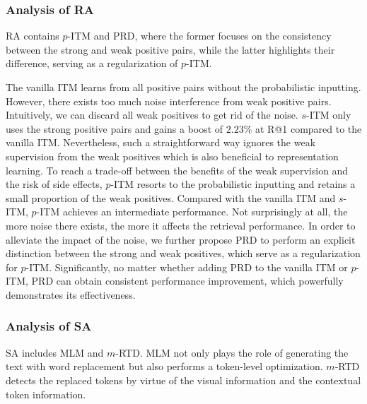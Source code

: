 \documentclass{article}
\begin{document}
\subsubsection{Analysis of RA}
RA contains $p$-ITM and PRD, where the former focuses on the consistency between the strong and weak positive pairs, while the latter highlights their difference, serving as a regularization of $p$-ITM. 

The vanilla ITM learns from all positive pairs without the probabilistic inputting.
However, there exists too much noise interference from weak positive pairs.
Intuitively, we can discard all weak positives to get rid of the noise. 
$s$-ITM only uses the strong positive pairs and gains a boost of $2.23$\% at R@1 compared to the vanilla ITM.
Nevertheless, such a straightforward way ignores the weak supervision from the weak positives which is also beneficial to representation learning. 
To reach a trade-off between the benefits of the weak supervision and the risk of side effects, $p$-ITM resorts to the probabilistic inputting and retains a small proportion of the weak positives.
Compared with the vanilla ITM and $s$-ITM, $p$-ITM achieves an intermediate performance.
Not surprisingly at all, the more noise there exists, the more it affects the retrieval performance.
In order to alleviate the impact of the noise, we further propose PRD to perform an explicit distinction between the strong and weak positives, which serve as a regularization for $p$-ITM.
Significantly, no matter whether adding PRD to the vanilla ITM or $p$-ITM, PRD can obtain consistent performance improvement, which powerfully demonstrates its effectiveness.


\subsubsection{Analysis of SA}
SA includes MLM and $m$-RTD. MLM not only plays the role of generating the text with word replacement but also performs a token-level optimization. $m$-RTD detects the replaced tokens by virtue of the visual information and the contextual token information.
\end{document}
